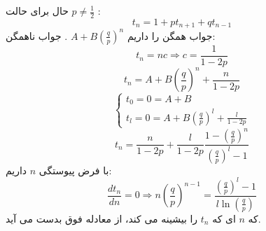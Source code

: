 \documentclass[]{article}
\begin{document}
	حال برای حالت 
	$p \neq \frac{1}{2}$ :
	\begin{equation}
		\nonumber
		t_n = 1 + p t_{n+1} + qt_{n-1}
	\end{equation}
	جواب همگن را داریم 
	$A + B(\frac{q}{p})^n$
	. جواب ناهمگن:
	\begin{equation}
		\nonumber
		t_n = nc \Rightarrow c = \frac{1}{1-2p}
	\end{equation}
	\begin{equation}
		\nonumber
		t_n = A + B(\frac{q}{p})^n + \frac{n}{1-2p}
	\end{equation}
	\begin{equation}
		\nonumber
		\begin{cases}
			t_0 = 0 = A + B\\
			t_l = 0 = A + B(\frac{q}{p})^l + \frac{l}{1-2p}
		\end{cases}
	\end{equation}
	\begin{equation}
		\nonumber
		t_n = \frac{n}{1-2p} + \frac{l}{1-2p} \frac{1 - (\frac{q}{p})^n}{(\frac{q}{p})^l - 1}
	\end{equation}
	با فرض پیوستگی $n$ داریم:
	\begin{equation}
		\nonumber
		\frac{dt_n}{dn} = 0 \Rightarrow n (\frac{q}{p})^{n-1} = \frac{(\frac{q}{p})^l - 1}{l \ln(\frac{q}{p})}
	\end{equation}
	که $n$ ای که $t_n$ را بیشینه می کند، از معادله فوق بدست می آید.
\newpage	
\end{document}
